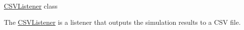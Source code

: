 \mbox{\hyperlink{classCore_1_1Listeners_1_1CSVListener}{CSVListener}} class

The \mbox{\hyperlink{classCore_1_1Listeners_1_1CSVListener}{CSVListener}} is a listener that outputs the simulation results to a CSV file. 